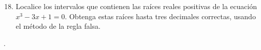 \begin{frame}
	\begin{enumerate}\setcounter{enumi}{17}
		\item


		      Localice los intervalos que contienen las raíces reales
		      positivas de la ecuación $x^{3}-3x+1=0$.
		      Obtenga estas raíces hasta tres decimales correctas, usando
		      el método de la regla falsa.

	\end{enumerate}

	\begin{solution}
		.
	\end{solution}
\end{frame}